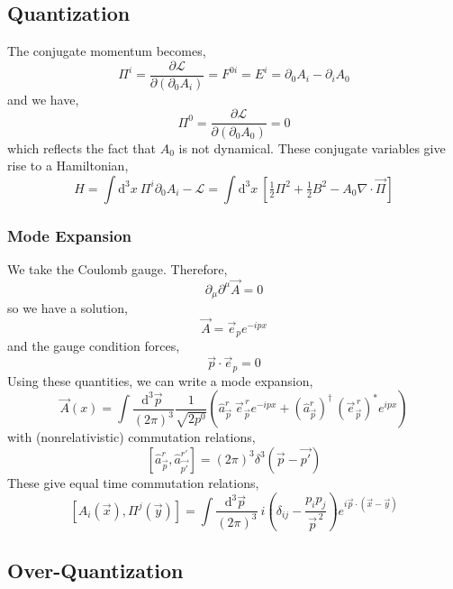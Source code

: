 \documentclass[12pt]{extarticle}
\newcommand{\dn}[2]{\! \mathrm{d}^{#1} #2 \:}
\newcommand{\pderiv}[2]{\frac{\partial{#1}}{\partial{#2}}}
\renewcommand{\a}{\hat{a}}
\newcommand{\lagrange}{\mathcal{L}}
\theoremstyle{definition}
\begin{document}
\subsection{Quantization}
The conjugate momentum becomes,
\[ \Pi^i = \pderiv{\lagrange}{(\partial_0 A_i)} = F^{0 i} = E^i = \partial_0 A_i - \partial_i A_0 \]
and we have,
\[ \Pi^0  = \pderiv{\lagrange}{(\partial_0 A_0)} = 0 \]
which reflects the fact that $A_0$ is not dynamical.
These conjugate variables give rise to a Hamiltonian,
\[ H = \int \dn{3}{x} \Pi^i \partial_0 A_i - \lagrange = \int \dn{3}{x} \left[ \tfrac{1}{2} \Pi^2 + \tfrac{1}{2} B^2 - A_0 \nabla \cdot \vec{\Pi} \right] \]
\subsubsection{Mode Expansion}
We take the Coulomb gauge. Therefore,
\[ \partial_\mu \partial^\mu \vec{A} = 0 \]
so we have a solution,
\[ \vec{A} = \vec{e}_p e^{- i p x} \]
and the gauge condition forces,
\[ \vec{p} \cdot \vec{e}_p = 0 \]
Using these quantities, we can write a mode expansion,
\[ \vec{A}(x) = \int \frac{\dn{3}{\vec{p}}}{(2 \pi )^3} \frac{1}{\sqrt{2 p^0}} \left( \a_{\vec{p}}^r \: \vec{e}^{\, r}_{\vec{p}} e^{-i p x} + (\a^r_{\vec{p}})^\dagger \: (\vec{e}^{\, r}_{\vec{p}})^* e^{i p x} \right) \]
with (nonrelativistic) commutation relations,
\[ [ \a^r_{\vec{p}}, \a^{r'}_{\vec{p'}} ] = (2 \pi)^3 \delta^3( \vec{p} - \vec{p'}) \]
These give equal time commutation relations,
\[ [A_i(\vec{x}), \Pi^j(\vec{y}) ] = \int \frac{ \dn{3}{\vec{p}}}{(2 \pi )^3} \: i \left( \delta_{ij} - \frac{p_i p_j}{\vec{p}^{\, 2}}  \right) e^{i \vec{p} \cdot (\vec{x} - \vec{y})} \]

\subsection{Over-Quantization}
\end{document}

